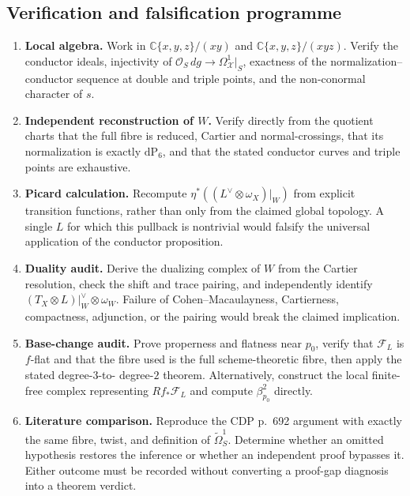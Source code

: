 \subsection{Verification and falsification programme}

\begin{enumerate}[label=\arabic*.]
\item \textbf{Local algebra.} Work in
$\mathbb C\{x,y,z\}/(xy)$ and $\mathbb C\{x,y,z\}/(xyz)$. Verify the
conductor ideals, injectivity of
$\mathcal O_S\,dg\to\Omega^1_{\mathcal X}|_S$, exactness of the
normalization--conductor sequence at double and triple points, and the
non-conormal character of $s$.

\item \textbf{Independent reconstruction of $W$.} Verify directly from
the quotient charts that the full fibre is reduced, Cartier and
normal-crossings, that its normalization is exactly $\mathrm{dP}_6$, and
that the stated conductor curves and triple points are exhaustive.

\item \textbf{Picard calculation.} Recompute
$\eta^*((L^\vee\otimes\omega_X)|_W)$ from explicit transition functions,
rather than only from the claimed global topology. A single $L$ for which
this pullback is nontrivial would falsify the universal application of the
conductor proposition.

\item \textbf{Duality audit.} Derive the dualizing complex of $W$ from
the Cartier resolution, check the shift and trace pairing, and independently
identify $(T_X\otimes L)|_W^\vee\otimes\omega_W$. Failure of
Cohen--Macaulayness, Cartierness, compactness, adjunction, or the pairing
would break the claimed implication.

\item \textbf{Base-change audit.} Prove properness and flatness near
$p_0$, verify that $\mathcal F_L$ is $f$-flat and that the fibre used is
the full scheme-theoretic fibre, then apply the stated degree-$3$-to-
degree-$2$ theorem. Alternatively, construct the local finite-free complex
representing $Rf_*\mathcal F_L$ and compute $\beta^2_{p_0}$ directly.

\item \textbf{Literature comparison.} Reproduce the CDP p.~692 argument
with exactly the same fibre, twist, and definition of
$\widetilde\Omega^1_S$. Determine whether an omitted hypothesis restores
the inference or whether an independent proof bypasses it. Either outcome
must be recorded without converting a proof-gap diagnosis into a theorem
verdict.
\end{enumerate}

